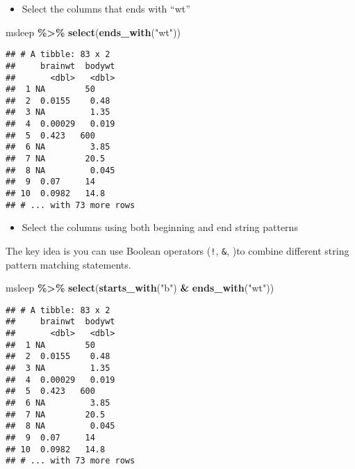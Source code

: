 \documentclass[
]{book}
\newenvironment{Shaded}{\begin{snugshade}}{\end{snugshade}}
\newcommand{\KeywordTok}[1]{\textcolor[rgb]{0.13,0.29,0.53}{\textbf{#1}}}
\newcommand{\NormalTok}[1]{#1}
\newcommand{\OperatorTok}[1]{\textcolor[rgb]{0.81,0.36,0.00}{\textbf{#1}}}
\newcommand{\StringTok}[1]{\textcolor[rgb]{0.31,0.60,0.02}{#1}}
\providecommand{\tightlist}{%
  \setlength{\itemsep}{0pt}\setlength{\parskip}{0pt}}
\begin{document}
\begin{itemize}
\tightlist
\item
  Select the columns that ends with ``wt''
\end{itemize}

\begin{Shaded}
\begin{Highlighting}[]
\NormalTok{msleep }\OperatorTok{\%\textgreater{}\%}
\StringTok{  }\KeywordTok{select}\NormalTok{(}\KeywordTok{ends\_with}\NormalTok{(}\StringTok{"wt"}\NormalTok{))}
\end{Highlighting}
\end{Shaded}

\begin{verbatim}
## # A tibble: 83 x 2
##     brainwt  bodywt
##       <dbl>   <dbl>
##  1 NA        50    
##  2  0.0155    0.48 
##  3 NA         1.35 
##  4  0.00029   0.019
##  5  0.423   600    
##  6 NA         3.85 
##  7 NA        20.5  
##  8 NA         0.045
##  9  0.07     14    
## 10  0.0982   14.8  
## # ... with 73 more rows
\end{verbatim}

\begin{itemize}
\tightlist
\item
  Select the columns using both beginning and end string patterns
\end{itemize}

The key idea is you can use Boolean operators (\texttt{!}, \texttt{\&}, \texttt{\textbar{}})to combine different string pattern matching statements.

\begin{Shaded}
\begin{Highlighting}[]
\NormalTok{msleep }\OperatorTok{\%\textgreater{}\%}
\StringTok{  }\KeywordTok{select}\NormalTok{(}\KeywordTok{starts\_with}\NormalTok{(}\StringTok{"b"}\NormalTok{) }\OperatorTok{\&}\StringTok{ }\KeywordTok{ends\_with}\NormalTok{(}\StringTok{"wt"}\NormalTok{))}
\end{Highlighting}
\end{Shaded}

\begin{verbatim}
## # A tibble: 83 x 2
##     brainwt  bodywt
##       <dbl>   <dbl>
##  1 NA        50    
##  2  0.0155    0.48 
##  3 NA         1.35 
##  4  0.00029   0.019
##  5  0.423   600    
##  6 NA         3.85 
##  7 NA        20.5  
##  8 NA         0.045
##  9  0.07     14    
## 10  0.0982   14.8  
## # ... with 73 more rows
\end{verbatim}
\end{document}
